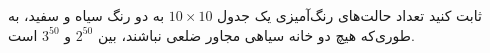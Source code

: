       \p
      ثابت کنید تعداد حالت‌های رنگ‌آمیزی یک جدول $10\times10$ به دو رنگ سیاه و سفید، به طوری‌که هیچ دو خانه سیاهی مجاور ضلعی نباشند، بین $2^{50}$ و $3^{50}$ است.
